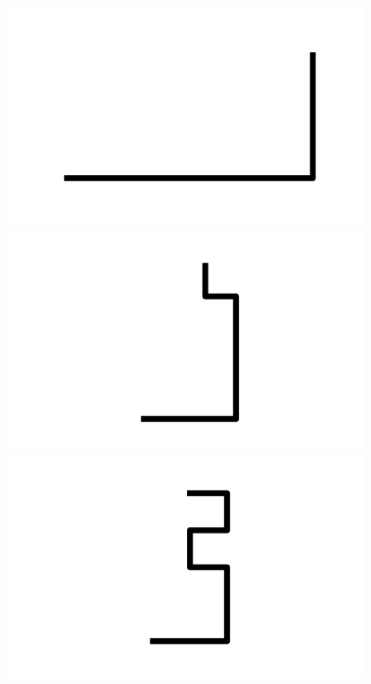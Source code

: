 \documentclass[]{report}
\begin{document}
\includegraphics[scale=.1]{pictures/21/state_cluster_shapes_31.pdf} 
\includegraphics[scale=.1]{pictures/21/state_cluster_shapes_32.pdf} 
\includegraphics[scale=.1]{pictures/21/state_cluster_shapes_33.pdf} 
\end{document}
